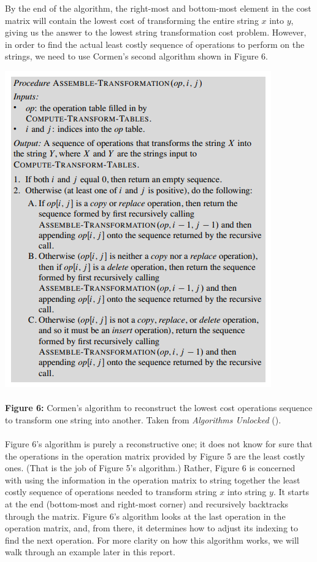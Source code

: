 \documentclass[12pt,letterpaper]{article}
\begin{document}
By the end of the algorithm, the right-most and bottom-most element in the cost matrix will contain the lowest cost of transforming the entire string $x$ into $y$, giving us the answer to the lowest string transformation cost problem. However, in order to find the actual least costly sequence of operations to perform on the strings, we need to use Cormen’s second algorithm shown in Figure 6.

\includegraphics[scale=0.8]{images/cormenalgo2.png}
\paragraph{}
\begin{footnotesize}
    \noindent\textbf{Figure 6:} Cormen's algorithm to reconstruct the lowest cost operations sequence to transform one string into another. Taken from \textit{Algorithms Unlocked} (\cite{cormen}).
\end{footnotesize}
\paragraph{}

Figure 6’s algorithm is purely a reconstructive one; it does not know for sure that the operations in the operation matrix provided by Figure 5 are the least costly ones. (That is the job of Figure 5’s algorithm.) Rather, Figure 6 is concerned with using the information in the operation matrix to string together the least costly sequence of operations needed to transform string $x$ into string $y$. It starts at the end (bottom-most and right-most corner) and recursively backtracks through the matrix. Figure 6’s algorithm looks at the last operation in the operation matrix, and, from there, it determines how to adjust its indexing to find the next operation. For more clarity on how this algorithm works, we will walk through an example later in this report.
\end{document}
